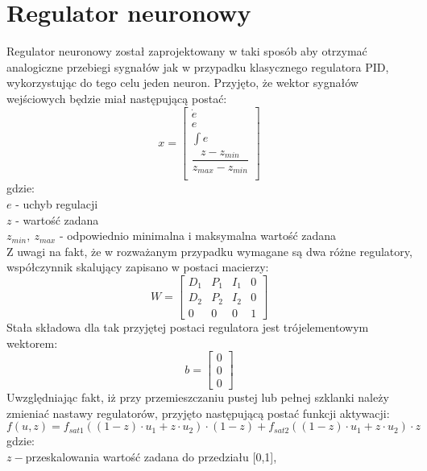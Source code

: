 \chapter{Regulator neuronowy}
Regulator neuronowy został zaprojektowany w taki sposób aby otrzymać analogiczne przebiegi sygnałów jak w przypadku klasycznego regulatora PID, wykorzystując do tego celu jeden neuron. Przyjęto, że wektor sygnałów wejściowych będzie miał następującą postać: 
\begin{equation}\label{key}
x = \begin{bmatrix}
\dot {e}\\
e\\
\int e\\
\dfrac{z-z_{min}}{z_{max} - z_{min}}\\
\end{bmatrix}
\end{equation}
gdzie:\\
$e$ - uchyb regulacji\\
$z$ - wartość zadana\\
$z_{min}, \ z_{max}$ - odpowiednio minimalna i maksymalna wartość zadana\\
Z uwagi na fakt, że w rozważanym przypadku wymagane są dwa różne regulatory, współczynnik skalujący zapisano w postaci macierzy: 
\begin{equation}\label{key}
W = \begin{bmatrix}
D_1& P_1& I_1&0\\
D_2& P_2& I_2&0\\
0&0&0&1
\end{bmatrix}
\end{equation} 
Stała składowa dla tak przyjętej postaci regulatora jest trójelementowym wektorem:
\begin{equation}\label{key}
b = \begin{bmatrix}
0\\0\\0
\end{bmatrix}
\end{equation}
Uwzględniając fakt, iż przy przemieszczaniu pustej lub pełnej szklanki należy zmieniać nastawy regulatorów, przyjęto następującą postać funkcji aktywacji:
\begin{equation}\label{key}
f(u,z) = f_{sat1} ((1-z) \cdot u_1 + z \cdot u_2) \cdot (1-z) + f_{sat2} ((1-z) \cdot u_1 + z \cdot u_2) \cdot z
\end{equation}
gdzie: \\
$z - $przeskalowania wartość zadana do przedziału [0,1],\\

